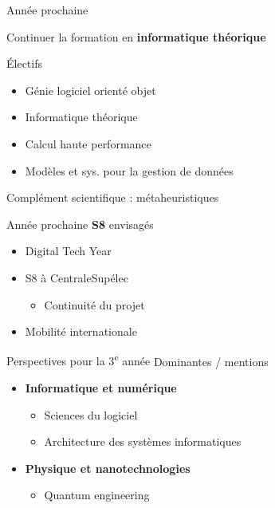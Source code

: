 \documentclass[french, 12pt]{beamer}
\begin{document}
\begin{frame}{Année prochaine}
\begin{center}
    Continuer la formation en \textbf{informatique théorique}
\end{center}
\small{Électifs} %
\footnotesize{
\begin{itemize}
    \item Génie logiciel orienté objet
    \item Informatique théorique
    \item Calcul haute performance
    \item Modèles et sys. pour la gestion de données
\end{itemize}}
\vspace{1em}
\small{Complément scientifique : métaheuristiques}
\end{frame}

\begin{frame}{Année prochaine}
\textbf{S8} envisagés
\begin{itemize}
    \item Digital Tech Year
    \item S8 à CentraleSupélec
    \begin{itemize}
        \item Continuité du projet
    \end{itemize}
    \item Mobilité internationale
\end{itemize}
\end{frame}

\begin{frame}{Perspectives pour la 3\textsuperscript{e} année}
Dominantes / mentions
\vspace{.5em}
\begin{itemize}
    \item \textbf{Informatique et numérique}
    \begin{itemize}
        \item Sciences du logiciel
        \item Architecture des systèmes informatiques
    \end{itemize}
    \item \textbf{Physique et nanotechnologies}
    \begin{itemize}
        \item Quantum engineering
    \end{itemize}
\end{itemize}
\end{frame}
\end{document}
